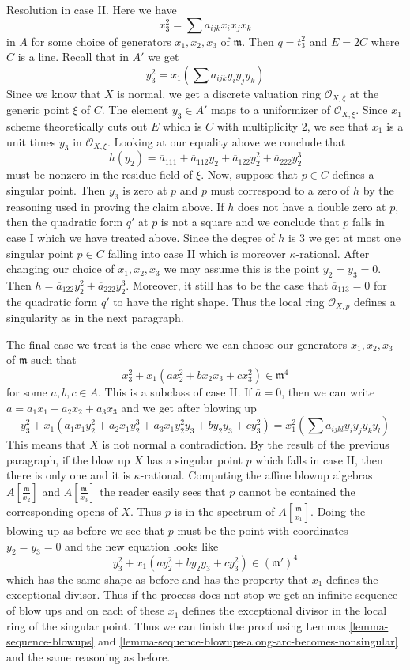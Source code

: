 \medskip\noindent
Resolution in case II. Here we have
$$
x_3^2 = \sum a_{ijk}x_ix_jx_k
$$
in $A$ for some choice of generators $x_1, x_2, x_3$ of $\mathfrak m$.
Then $q = t_3^2$ and $E = 2C$ where $C$ is a line.
Recall that in $A'$ we get
$$
y_3^2 = x_1(\sum a_{ijk} y_iy_jy_k)
$$
Since we know that $X$ is normal, we get a discrete valuation
ring $\mathcal{O}_{X, \xi}$ at the generic point $\xi$ of $C$.
The element $y_3 \in A'$ maps to a uniformizer of $\mathcal{O}_{X, \xi}$.
Since $x_1$ scheme theoretically cuts out $E$
which is $C$ with multiplicity $2$, we see that
$x_1$ is a unit times $y_3$ in $\mathcal{O}_{X, \xi}$. Looking
at our equality above we conclude that
$$
h(y_2) = \overline{a}_{111} + \overline{a}_{112} y_2 +
\overline{a}_{122} y_2^2 +
\overline{a}_{222} y_2^3
$$
must be nonzero in the residue field of $\xi$.
Now, suppose that $p \in C$ defines a singular point.
Then $y_3$ is zero at $p$ and $p$ must correspond to a
zero of $h$ by the reasoning used in proving the claim above.
If $h$ does not have a double zero at $p$, then the quadratic
form $q'$ at $p$ is not a square and we conclude that $p$
falls in case I which we have treated above.
Since the degree of $h$ is $3$ we
get at most one singular point $p \in C$ falling into case II
which is moreover $\kappa$-rational. After changing our
choice of $x_1, x_2, x_3$ we may assume this is the point
$y_2 = y_3 = 0$.
Then $h = \overline{a}_{122} y_2^2 + \overline{a}_{222} y_2^3$.
Moreover, it still has to be the case that
$\overline{a}_{113} = 0$ for the quadratic form $q'$ to have
the right shape.
Thus the local ring $\mathcal{O}_{X, p}$ defines a singularity
as in the next paragraph.

\medskip\noindent
The final case we treat is the case where we can choose our generators
$x_1, x_2, x_3$ of $\mathfrak m$ such that
$$
x_3^2 + x_1(a x_2^2 + b x_2x_3 + c x_3^2) \in \mathfrak m^4
$$
for some $a, b, c \in A$. This is a subclass of case II. If
$\overline{a} = 0$, then we can write
$a = a_1 x_1 + a_2 x_2 + a_3 x_3$ and we get after blowing up
$$
y_3^2 + x_1(a_1 x_1 y_2^2 + a_2 x_1 y_2^3 + a_3 x_1 y_2^2 y_3 +
b y_2 y_3 + c y_3^2) = x_1^2 (\sum a_{ijkl}y_iy_jy_ky_l)
$$
This means that $X$ is not normal a contradiction. By the result
of the previous paragraph, if the blow up $X$
has a singular point $p$ which falls in case II, then
there is only one and it is $\kappa$-rational.
Computing the affine blowup algebras
$A[\frac{\mathfrak m}{x_2}]$ and $A[\frac{\mathfrak m}{x_3}]$
the reader easily sees that $p$ cannot be contained
the corresponding opens of $X$. Thus $p$ is in the spectrum
of $A[\frac{\mathfrak m}{x_1}]$. Doing the blowing up as before we see that
$p$ must be the point with coordinates $y_2 = y_3 = 0$ and the new
equation looks like
$$
y_3^2 + x_1(a y_2^2 + b y_2 y_3 + c y_3^2) \in (\mathfrak m')^4
$$
which has the same shape as before and has the property
that $x_1$ defines the exceptional divisor. Thus if the process
does not stop we get an infinite sequence of blow ups and on
each of these $x_1$ defines the exceptional divisor in the
local ring of the singular point. Thus we can
finish the proof using
Lemmas \ref{lemma-sequence-blowups} and
\ref{lemma-sequence-blowups-along-arc-becomes-nonsingular}
and the same reasoning as before.

